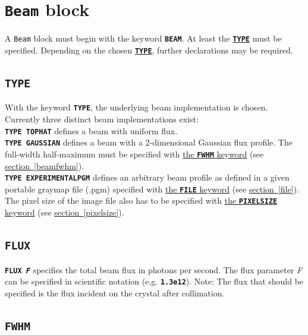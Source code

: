 \documentclass[a4paper]{article}
\newcommand{\Class}[1]{\texttt{#1}\xspace}
\newcommand{\Keyword}[1]{\texttt{\textbf{#1}}\xspace}
\newcommand{\SB}{\\[0.2em]}
\begin{document}
\label{RDv3End}

\newpage
\section{\Class{Beam} block}

A \Class{Beam} block must begin with the keyword \Keyword{BEAM}.
At least the \hyperref[beamtype]{\Keyword{TYPE}} must be specified.
Depending on the chosen \hyperref[beamtype]{\Keyword{TYPE}}, further declarations may be required.


\subsection{\Keyword{TYPE}}
\label{beamtype}

With the keyword \Keyword{TYPE}, the underlying beam implementation is chosen.
Currently three distinct beam implementations exist:\SB

\noindent \Keyword{TYPE TOPHAT} defines a beam with uniform flux.\SB

\noindent \Keyword{TYPE GAUSSIAN} defines a beam with a 2-dimensional Gaussian flux profile. The full-width half-maximum must be specified with \hyperref[beamfwhm]{the \Keyword{FWHM} keyword} (see \hyperref[beamfwhm]{section~\ref*{beamfwhm}}).\SB

\noindent \Keyword{TYPE EXPERIMENTALPGM} defines an arbitrary beam profile as defined in a given portable graymap file (.pgm) specified with \hyperref[file]{the \Keyword{FILE} keyword} (see \hyperref[file]{section~\ref*{file}}). The pixel size of the image file also has to be specified with \hyperref[pixelsize]{the \Keyword{PIXELSIZE} keyword} (see \hyperref[pixelsize]{section~\ref*{pixelsize}}).\SB


\subsection{\Keyword{FLUX}}
\label{flux}

\noindent \Keyword{FLUX \textit{F}} specifies the total beam flux in photons per second. The flux parameter \textit{F} can be specified in scientific notation (e.g. \Keyword{1.3e12}). Note: The flux that should be specified is the flux incident on the crystal after collimation.


\subsection{\Keyword{FWHM}}
\end{document}
